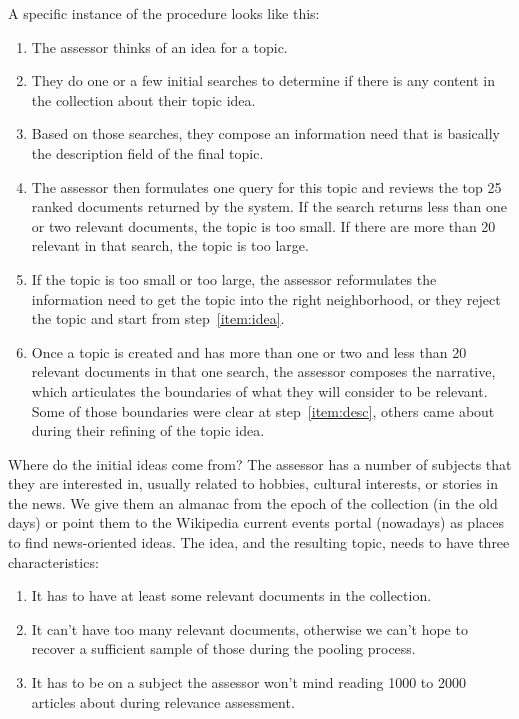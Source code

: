 \documentclass[nobib]{tufte-book}
\begin{document}
A specific instance of the procedure looks like this:
\begin{enumerate}
    \item \label{item:idea} The assessor thinks of an idea for a topic.
    \item They do one or a few initial searches to determine if there is any content in the collection about their topic idea.
    \item \label{item:desc} Based on those searches, they compose an information need that is basically the description field of the final topic.
    \item The assessor then formulates one query for this topic and reviews the top 25 ranked documents returned by the system.  If the search returns less than one or two relevant documents, the topic is too small.  If there are more than 20 relevant in that search, the topic is too large.
    \item If the topic is too small or too large, the assessor reformulates the information need to get the topic into the right neighborhood, or they reject the topic and start from step~\ref{item:idea}.
    \item Once a topic is created and has more than one or two and less than 20 relevant documents in that one search, the assessor composes the narrative, which articulates the boundaries of what they will consider to be relevant.  Some of those boundaries were clear at step~\ref{item:desc}, others came about during their refining of the topic idea.
\end{enumerate}

Where do the initial ideas come from?  The assessor has a number of subjects that they are interested in, usually related to hobbies, cultural interests, or stories in the news.  We give them an almanac from the epoch of the collection (in the old days) or point them to the Wikipedia current events portal (nowadays) as places to find news-oriented ideas.  The idea, and the resulting topic, needs to have three characteristics:
\begin{enumerate}
    \item It has to have at least some relevant documents in the collection.
    \item It can't have too many relevant documents, otherwise we can't hope to recover a sufficient sample of those during the pooling process.
    \item It has to be on a subject the assessor won't mind reading 1000 to 2000 articles about during relevance assessment.
\end{enumerate}
\end{document}
